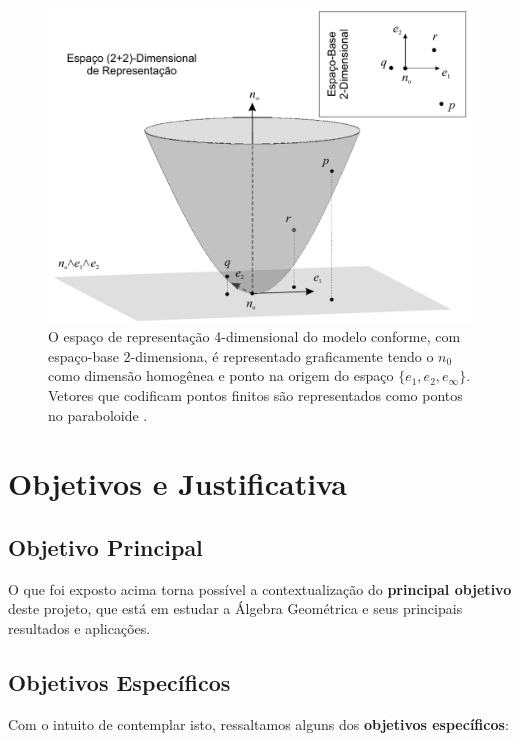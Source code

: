 \documentclass[11pt]{article}
\begin{document}
\begin{figure}[H]
	\begin{center}
		\includegraphics[width=0.75\linewidth]{figures/conforme.png}
	\end{center}
	\caption{O espaço de representação 4-dimensional do modelo conforme, com espaço-base 2-dimensiona, é representado graficamente tendo o $n_0$ como dimensão homogênea e ponto na origem do espaço $\{e_1, e_2, e_\infty\}$. Vetores que codificam pontos finitos são representados como pontos no paraboloide \cite{leandro2017algebra}.}
	\label{fig:conforme}
\end{figure}


\section{Objetivos e Justificativa} \label{aims}


\subsection{Objetivo Principal}

O que foi exposto acima torna possível a contextualização do {\bf principal objetivo} deste projeto, que está em estudar a Álgebra Geométrica e seus principais resultados e aplicações. 

\subsection{Objetivos Específicos}

Com o intuito de contemplar isto, ressaltamos alguns dos {\bf objetivos específicos}:
\end{document}
